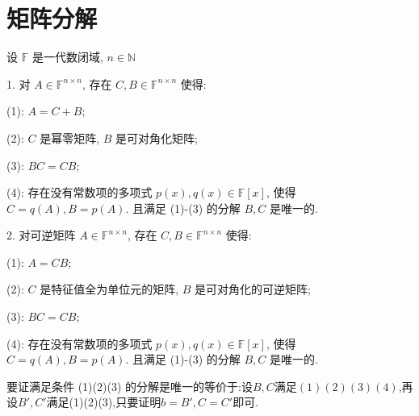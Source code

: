 \documentclass[../../main.tex]{subfiles}
\begin{document}
\section{矩阵分解}

\begin{theorem}[Jordan分解]\label{theorem:矩阵分解-Jordan分解}
设 \( \mathbb{F} \) 是一代数闭域, \( n \in \mathbb{N} \)

1. 对 \( A \in \mathbb{F}^{n \times n} \), 存在 \( C, B \in \mathbb{F}^{n \times n} \) 使得:

(1): \( A = C + B \);

(2): \( C \) 是幂零矩阵, \( B \) 是可对角化矩阵;

(3): \( BC = CB \);

(4): 存在没有常数项的多项式 \( p(x), q(x) \in \mathbb{F}[x] \), 使得 \( C = q(A), B = p(A) \). 且满足 (1)-(3) 的分解 \( B, C \) 是唯一的.

2. 对可逆矩阵 \( A \in \mathbb{F}^{n \times n} \), 存在 \( C, B \in \mathbb{F}^{n \times n} \) 使得:

(1): \( A = CB \);

(2): \( C \) 是特征值全为单位元的矩阵, \( B \) 是可对角化的可逆矩阵;

(3): \( BC = CB \);

(4): 存在没有常数项的多项式 \( p(x), q(x) \in \mathbb{F}[x] \), 使得 \( C = q(A), B = p(A) \). 且满足 (1)-(3) 的分解 \( B, C \) 是唯一的.
\end{theorem}
\begin{remark}
要证满足条件 (1)(2)(3) 的分解是唯一的等价于:设$B,C$满足$(1)(2)(3)(4)$,再设$B',C'$满足(1)(2)(3),只要证明$b=B',C=C'$即可.
\end{remark}
\end{document}
